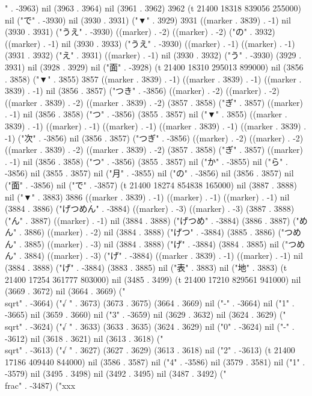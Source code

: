 " . -3963) nil (3963 . 3964) nil (3961 . 3962) 3962 (t 21400 18318 839056 255000) nil ("で" . -3930) nil (3930 . 3931) ("▼" . 3929) 3931 ((marker . 3839) . -1) nil (3930 . 3931) ("うえ" . -3930) ((marker) . -2) ((marker) . -2) ("の" . 3932) ((marker) . -1) nil (3930 . 3933) ("うえ" . -3930) ((marker) . -1) ((marker) . -1) (3931 . 3932) ("え" . 3931) ((marker) . -1) nil (3930 . 3932) ("う" . -3930) (3929 . 3931) nil (3928 . 3929) nil ("面" . -3928) (t 21400 18310 295013 899000) nil (3856 . 3858) ("▼" . 3855) 3857 ((marker . 3839) . -1) ((marker . 3839) . -1) ((marker . 3839) . -1) nil (3856 . 3857) ("つき" . -3856) ((marker) . -2) ((marker) . -2) ((marker . 3839) . -2) ((marker . 3839) . -2) (3857 . 3858) ("ぎ" . 3857) ((marker) . -1) nil (3856 . 3858) ("つ" . -3856) (3855 . 3857) nil ("▼" . 3855) ((marker . 3839) . -1) ((marker) . -1) ((marker) . -1) ((marker . 3839) . -1) ((marker . 3839) . -1) ("次" . -3856) nil (3856 . 3857) ("つぎ" . -3856) ((marker) . -2) ((marker) . -2) ((marker . 3839) . -2) ((marker . 3839) . -2) (3857 . 3858) ("ぎ" . 3857) ((marker) . -1) nil (3856 . 3858) ("つ" . -3856) (3855 . 3857) nil ("か" . -3855) nil ("ら" . -3856) nil (3855 . 3857) nil ("月" . -3855) nil ("の" . -3856) nil (3856 . 3857) nil ("面" . -3856) nil ("で" . -3857) (t 21400 18274 854838 165000) nil (3887 . 3888) nil ("▼" . 3883) 3886 ((marker . 3839) . -1) ((marker) . -1) ((marker) . -1) nil (3884 . 3886) ("げつめん" . -3884) ((marker) . -3) ((marker) . -3) (3887 . 3888) ("ん" . 3887) ((marker) . -1) nil (3884 . 3888) ("げつめ" . -3884) (3886 . 3887) ("めん" . 3886) ((marker) . -2) nil (3884 . 3888) ("げつ" . -3884) (3885 . 3886) ("つめん" . 3885) ((marker) . -3) nil (3884 . 3888) ("げ" . -3884) (3884 . 3885) nil ("つめん" . 3884) ((marker) . -3) ("げ" . -3884) ((marker . 3839) . -1) ((marker) . -1) nil (3884 . 3888) ("げ" . -3884) (3883 . 3885) nil ("表" . 3883) nil ("地" . 3883) (t 21400 17254 361777 803000) nil (3485 . 3499) (t 21400 17210 829561 941000) nil (3669 . 3672) nil (3664 . 3669) ("\\sqrt" . -3664) ("√
" . 3673) (3673 . 3675) (3664 . 3669) nil ("-" . -3664) nil ("1" . -3665) nil (3659 . 3660) nil ("3" . -3659) nil (3629 . 3632) nil (3624 . 3629) ("\\sqrt" . -3624) ("√
" . 3633) (3633 . 3635) (3624 . 3629) nil ("0" . -3624) nil ("-" . -3612) nil (3618 . 3621) nil (3613 . 3618) ("\\sqrt" . -3613) ("√
" . 3627) (3627 . 3629) (3613 . 3618) nil ("2" . -3613) (t 21400 17186 409440 844000) nil (3586 . 3587) nil ("4" . -3586) nil (3579 . 3581) nil ("1" . -3579) nil (3495 . 3498) nil (3492 . 3495) nil (3487 . 3492) ("\\frac" . -3487) ("xxx
